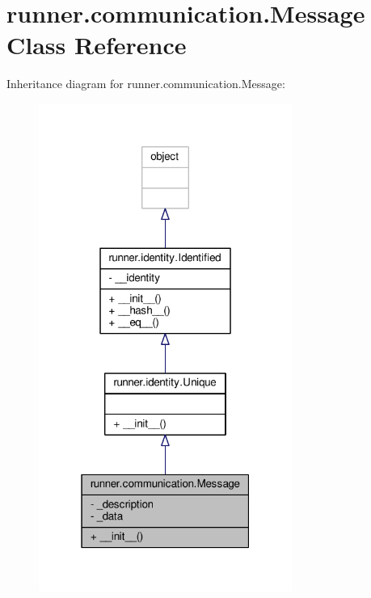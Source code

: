 \hypertarget{classrunner_1_1communication_1_1Message}{}\section{runner.\+communication.\+Message Class Reference}
\label{classrunner_1_1communication_1_1Message}


Inheritance diagram for runner.\+communication.\+Message\+:
\nopagebreak
\begin{figure}[H]
\begin{center}
\leavevmode
\includegraphics[width=235pt]{classrunner_1_1communication_1_1Message__inherit__graph}
\end{center}
\end{figure}


